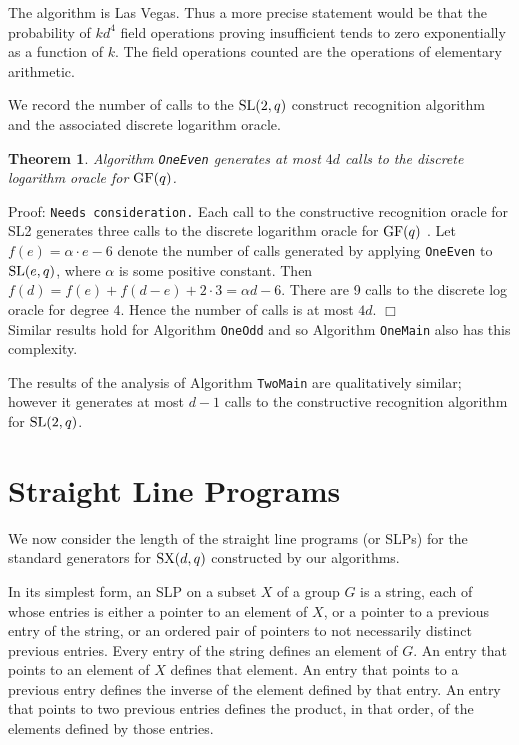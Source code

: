 \documentclass[12pt]{article}
\newtheorem{theorem}[definition]{Theorem}
\newenvironment{proof}{\normalsize {\sc Proof}:}{{\hfill $\Box$ \\}}
\def\SL{{\rm SL}}
\def\GF{{\rm GF}}
\def\SX{{\rm SX}}
\begin{document}
The algorithm is Las Vegas. Thus a more precise statement
would be that the probability of $kd^4$ field operations proving
insufficient tends to zero exponentially as a function of $k$. 
The field operations counted are the operations of elementary
arithmetic. 

We record the number of calls to the $\SL(2, q)$ construct
recognition algorithm and the associated discrete logarithm oracle.
\begin{theorem}\label{Theorem2} 
Algorithm {\tt OneEven} generates at most $4d$ calls to 
the discrete logarithm oracle for $\GF(q)$.
\end{theorem}
\begin{proof}
{\tt Needs consideration.} 
Each call to the constructive recognition oracle for SL2 generates 
three calls to the discrete logarithm oracle for $\GF(q)$ \cite{Conderetal05}.
Let $f(e) =  \alpha\cdot e - 6$ denote the number
of calls generated by applying {\tt OneEven} to $\SL(e, q)$, 
where $\alpha$ is some positive constant.  
Then $f(d) = f(e) + f(d - e) + 2 \cdot 3 = \alpha d - 6$.
There are 9 calls to the discrete log oracle for degree 4.
Hence the number of calls is at most $4d$.
\end{proof}
Similar results hold for Algorithm {\tt OneOdd} and so 
Algorithm {\tt OneMain} also has this complexity.

The results of the analysis of Algorithm {\tt TwoMain} are 
qualitatively similar; however it generates at most $d-1$ calls to the 
constructive recognition algorithm for $\SL(2,q)$.  

\section{Straight Line Programs}\label{SLP}

We now consider the length of the straight line programs (or SLPs) for
the standard generators for $\SX(d, q)$ constructed by our algorithms.

In its simplest form, 
an SLP on a subset $X$ of a group $G$ is a
string, each of whose entries is either a pointer to an element of $X$, 
or a pointer to a previous
entry of the string, or an ordered pair of pointers to not necessarily 
distinct previous entries.
Every entry of the string defines an element of $G$.  An 
entry that points to an element of
$X$ defines that element.  An entry that points to a previous entry defines 
the inverse of the element defined by that entry.  An entry that points to 
two previous entries defines the
product, in that order, of the elements defined by those entries.
\end{document}
